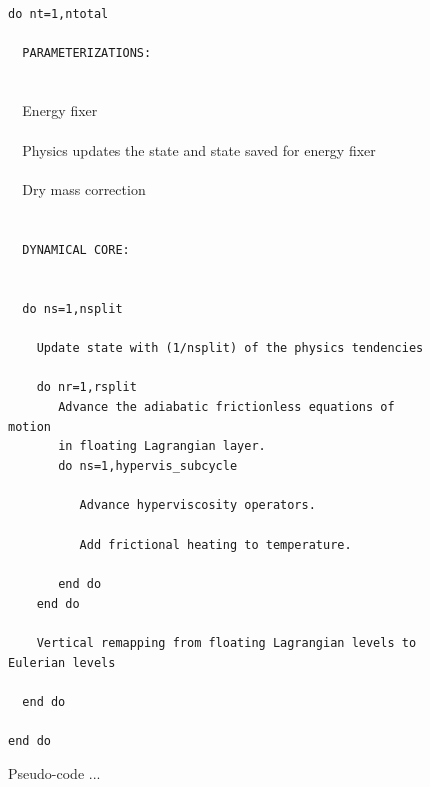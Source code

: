 \documentclass{agujournal}
\begin{document}
\begin{figure}[h]

\verb+do nt=1,ntotal+\\
\verb+  +\\
\verb+  PARAMETERIZATIONS:+\\
\verb+  +\\
\verb+  +{\color{blue}{output 'pBF'}}\\
\verb+  +Energy fixer\\
\verb+  +{\color{blue}{output 'pBP'}}\\
\verb+  +Physics updates the state and state saved for energy fixer\\
\verb+  +{\color{blue}{output 'pAP'}}\\
\verb+  +Dry mass correction\\
\verb+  +{\color{blue}{output 'pAM'}}\\
\verb+  +\\
\verb+  DYNAMICAL CORE:+\\
\verb+  +\\
\verb+  +{\color{blue}{output 'dED'}}\\
\verb+  do ns=1,nsplit+\\
\verb+    +{\color{blue}{output 'dAF'}}\\
\verb+    Update state with (1/nsplit) of the physics tendencies+\\
\verb+    +{\color{blue}{output 'dBD'}}\\
\verb+    do nr=1,rsplit+\\
\verb+       Advance the adiabatic frictionless equations of motion +\\
\verb+       in floating Lagrangian layer.+\\
\verb+       do ns=1,hypervis_subcycle+\\
\verb+          +{\color{blue}{output 'dBH'}}\\
\verb+          Advance hyperviscosity operators.+\\
\verb+          +{\color{blue}{output 'dCH'}}\\
\verb+          Add frictional heating to temperature.+\\
\verb+          +{\color{blue}{output 'dAH'}}\\
\verb+       end do+\\
\verb+    end do+\\
\verb+    +{\color{blue}{output 'dAD'}}\\
\verb+    Vertical remapping from floating Lagrangian levels to Eulerian levels+\\
\verb+    +{\color{blue}{output 'dAR'}}\\
\verb+  end do+\\
\verb+  +{\color{blue}{output 'dBF'}}\\
\verb+end do+
\caption{Pseudo-code ...}
\label{fig:dAD}
\end{figure}
\end{document}
